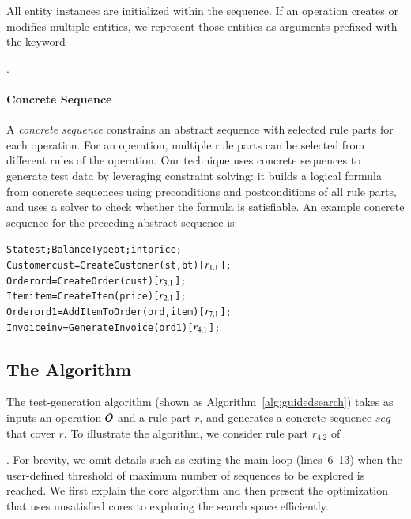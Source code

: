 All entity instances are initialized within the sequence.  If an operation
creates or modifies multiple entities, we represent those entities as arguments
prefixed with the keyword \subject{out}.

\vskip -7pt
\paragraph*{Concrete Sequence} A \textit{concrete sequence} constrains an
abstract sequence with selected rule parts for each operation. For an operation,
multiple rule parts can be selected from different rules of the operation. Our
technique uses concrete sequences to generate test data by leveraging 
constraint solving: it builds a logical formula from concrete sequences using
preconditions and postconditions of all rule parts, and uses a solver to check
whether the formula is satisfiable. An example concrete sequence for the
preceding abstract sequence is:

\vspace*{-4pt}
{\scriptsize
\begin{alltt} 
 State st; BalanceType bt; int price;
 Customer cust = CreateCustomer(st, bt) [\(r\sb{1.1}\)];
 Order ord = CreateOrder(cust) [\(r\sb{3.1}\)];	
 Item item = CreateItem(price) [\(r\sb{2.1}\)];
 Order ord1 = AddItemToOrder(ord, item) [\(r\sb{7.1}\)];
 Invoice inv = GenerateInvoice(ord1) [\(r\sb{4.1}\)];  
\end{alltt}
}
\vspace*{-5pt}

\subsection{The Algorithm}
\label{sec:technique}

The test-generation algorithm (shown as Algorithm~\ref{alg:guidedsearch}) takes
as inputs an operation ${\cal O}$ and a rule part $r$, and generates a concrete
sequence $seq$ that cover $r$. To illustrate the algorithm, we consider rule
part $r_{4.2}$ of \subject{GenerateInvoice}. For brevity, we omit details such
as exiting the main loop (lines~6--13) when the user-defined threshold of
maximum number of sequences to be explored is reached. We first explain the core
algorithm and then present the optimization that uses unsatisfied cores to
exploring the search space efficiently.


